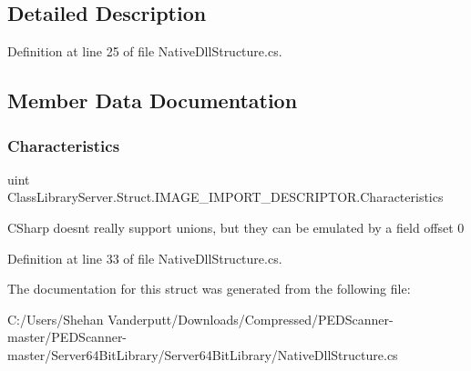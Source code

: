 \subsection{Detailed Description}


Definition at line 25 of file Native\+Dll\+Structure.\+cs.



\subsection{Member Data Documentation}
\mbox{\label{struct_class_library_server_1_1_struct_1_1_i_m_a_g_e___i_m_p_o_r_t___d_e_s_c_r_i_p_t_o_r_a58deeb6b3dc021c27efff07331a86a02}} 
\subsubsection{\texorpdfstring{Characteristics}{Characteristics}}
{\footnotesize\ttfamily uint Class\+Library\+Server.\+Struct.\+I\+M\+A\+G\+E\+\_\+\+I\+M\+P\+O\+R\+T\+\_\+\+D\+E\+S\+C\+R\+I\+P\+T\+O\+R.\+Characteristics}



C\+Sharp doesnt really support unions, but they can be emulated by a field offset 0 



Definition at line 33 of file Native\+Dll\+Structure.\+cs.



The documentation for this struct was generated from the following file\+:\begin{DoxyCompactItemize}
\item 
C\+:/\+Users/\+Shehan Vanderputt/\+Downloads/\+Compressed/\+P\+E\+D\+Scanner-\/master/\+P\+E\+D\+Scanner-\/master/\+Server64\+Bit\+Library/\+Server64\+Bit\+Library/Native\+Dll\+Structure.\+cs\end{DoxyCompactItemize}
